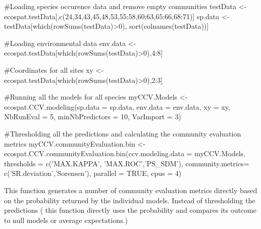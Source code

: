 \documentclass[a4paper]{book}
\begin{document}
\begin{Examples}
\begin{ExampleCode}
#Loading species occurence data and remove empty communities
testData <- ecospat.testData[,c(24,34,43,45,48,53,55:58,60:63,65:66,68:71)]
sp.data <- testData[which(rowSums(testData)>0), sort(colnames(testData))]

#Loading environmental data
env.data <- ecospat.testData[which(rowSums(testData)>0),4:8]

#Coordinates for all sites
xy <- ecospat.testData[which(rowSums(testData)>0),2:3]

#Running all the models for all species
myCCV.Models <- ecospat.CCV.modeling(sp.data = sp.data,
                                     env.data = env.data,
                                     xy = xy,
                                     NbRunEval = 5,
                                     minNbPredictors = 10,
                                     VarImport = 3)
                                     
#Thresholding all the predictions and calculating the community evaluation metrics
myCCV.communityEvaluation.bin <- ecospat.CCV.communityEvaluation.bin(ccv.modeling.data = myCCV.Models,
                                                                     thresholds = c('MAX.KAPPA', 'MAX.ROC','PS_SDM'),
                                                                     community.metrics= c('SR.deviation','Sorensen'),
                                                                     parallel = TRUE,
                                                                     cpus = 4)
\end{ExampleCode}
\end{Examples}
%
\begin{Description}\relax
This function generates a number of community evaluation metrics directly based on the probability returned by the individual models. Instead of thresholding the predictions ( this function directly uses the probability and compares its outcome to null models or average expectations.)
\end{Description}
\end{document}
